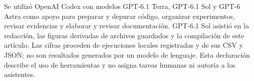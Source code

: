 \documentclass[conference]{IEEEtran}
\begin{document}
Se utilizó OpenAI Codex con modelos GPT-6.1 Terra, GPT-6.1 Sol y GPT-6 Astra como apoyo para preparar y depurar código, organizar experimentos, revisar evidencias y elaborar y revisar documentación. GPT-6.1 Sol asistió en la redacción, las figuras derivadas de archivos guardados y la compilación de este artículo. Las cifras proceden de ejecuciones locales registradas y de sus CSV y JSON; no son resultados generados por un modelo de lenguaje. Esta declaración describe el uso de herramientas y no asigna tareas humanas ni autoría a los asistentes.



\end{document}
